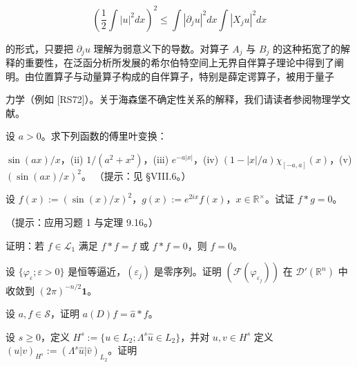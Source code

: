 \[
\left(\frac{1}{2}\int |u|^2 dx\right)^2 \le \int |\partial_j u|^2 dx \int |X_j u|^2 dx
\]

的形式，只要把 $ \partial_j u $ 理解为弱意义下的导数。对算子 $ A_j $ 与 $ B_j $ 的这种拓宽了的解释的重要性，在泛函分析所发展的希尔伯特空间上无界自伴算子理论中得到了阐明。由位置算子与动量算子构成的自伴算子，特别是薛定谔算子，被用于量子

力学（例如 [RS72]）。关于海森堡不确定性关系的解释，我们请读者参阅物理学文献。

\exerciseshead

\begin{exercises}
\item

设 $ a > 0 $。求下列函数的傅里叶变换：

\begin{subitems}
\item

$ \sin(ax)/x $，(ii) $ 1/(a^2 + x^2) $，(iii) $ e^{-a|x|} $，(iv) $ (1 - |x|/a)\chi_{[-a,a]}(x) $，(v) $ (\sin(ax)/x)^2 $。
（提示：见 §VIII.6。）

\end{subitems}

\item

设 $ f(x) := (\sin(x)/x)^2 $，$ g(x) := e^{2ix}f(x) $，$ x \in \mathbb{R}^\times $。试证 $ f * g = 0 $。

（提示：应用习题 1 与定理 9.16。）

\item

证明：若 $ f \in \mathcal{L}_1 $ 满足 $ f * f = f $ 或 $ f * f = 0 $，则 $ f = 0 $。

\item

设 $ \{\varphi_\varepsilon ; \varepsilon > 0\} $ 是恒等逼近，$ (\varepsilon_j) $ 是零序列。证明 $ (\mathcal{F}(\varphi_{\varepsilon_j})) $ 在 $ \mathcal{D}'(\mathbb{R}^n) $ 中收敛到 $ (2\pi)^{-n/2}\mathbf{1} $。

\item

设 $ a, f \in \mathcal{S} $，证明 $ a(D)f = \widehat{a} * f $。

\item

设 $ s \ge 0 $，定义 $ H^s := \{u \in L_2 ; \Lambda^s \widehat{u} \in L_2\} $，并对 $ u, v \in H^s $ 定义 $ (u|v)_{H^s} := (\Lambda^s \widehat{u} | \widehat{v})_{L_2} $。证明

\begin{subitems}
\item


\end{subitems}
\end{exercises}
